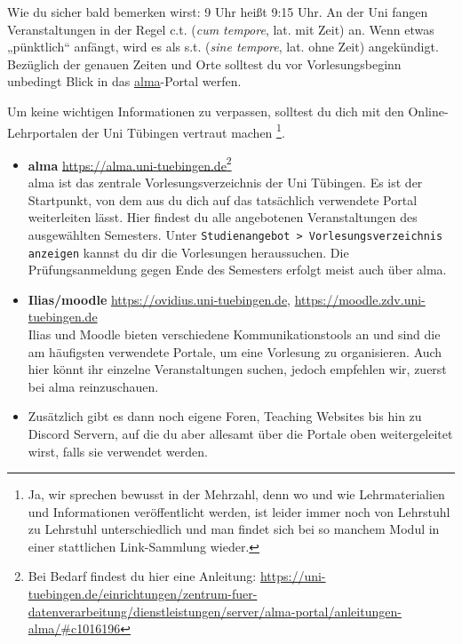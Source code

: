 Wie du sicher bald bemerken wirst: 9 Uhr heißt 9:15 Uhr. An der Uni fangen Veranstaltungen in der Regel c.t. (\textit{cum
tempore}, lat. \glqq mit Zeit\grqq) an. Wenn etwas „pünktlich“ anfängt, wird es als s.t. (\textit{sine tempore}, lat. \glqq ohne
Zeit\grqq) angekündigt.
Bezüglich der genauen Zeiten und Orte solltest du vor Vorlesungsbeginn unbedingt Blick in das \hyperlink{alma}{alma}-Portal werfen.


Um keine wichtigen Informationen zu verpassen, solltest du dich mit den Online-Lehrportalen der Uni Tübingen vertraut machen
\footnote{Ja, wir sprechen bewusst in der Mehrzahl, denn wo und wie Lehrmaterialien und Informationen veröffentlicht werden, ist leider immer noch
von Lehrstuhl zu Lehrstuhl unterschiedlich und man findet sich bei so manchem Modul in einer stattlichen Link-Sammlung wieder.}.
\begin{itemize}
	\item \textbf{\hypertarget{alma}{alma}} \url{https://alma.uni-tuebingen.de}\footnote{Bei Bedarf findest du hier eine Anleitung: \url{https://uni-tuebingen.de/einrichtungen/zentrum-fuer-datenverarbeitung/dienstleistungen/server/alma-portal/anleitungen-alma/\#c1016196}} \\
	alma ist das zentrale Vorlesungsverzeichnis der Uni Tübingen. Es ist der Startpunkt, von dem aus du dich auf das tatsächlich verwendete Portal weiterleiten lässt.
	Hier findest du alle angebotenen Veranstaltungen des ausgewählten Semesters. Unter \texttt{Studienangebot > Vorlesungsverzeichnis anzeigen} kannst du dir die Vorlesungen heraussuchen. Die Prüfungsanmeldung gegen Ende des Semesters erfolgt meist auch über alma.
	\item \textbf{Ilias/moodle} \url{https://ovidius.uni-tuebingen.de}, \url{https://moodle.zdv.uni-tuebingen.de} \\
	Ilias und Moodle bieten verschiedene Kommunikationstools an und sind die am häufigsten verwendete Portale, um eine Vorlesung zu organisieren.
	Auch hier könnt ihr einzelne Veranstaltungen suchen, jedoch empfehlen wir, zuerst bei alma reinzuschauen.
	\item Zusätzlich gibt es dann noch eigene Foren, Teaching Websites bis hin zu Discord Servern, auf die du aber allesamt über die Portale oben
	weitergeleitet wirst, falls sie verwendet werden.
\end{itemize}

\ifbachelor \ifmedinfo \pagebreak \fi \fi
\ifbachelor \ifmedien \pagebreak \fi \fi
\ifbachelor \ifbinfo \pagebreak \fi \fi


